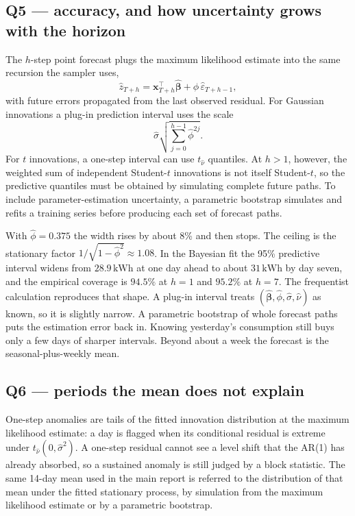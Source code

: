 \documentclass[11pt]{article}
\newcommand{\kwh}{\,\mathrm{kWh}}
\begin{document}
\subsection{Q5 --- accuracy, and how uncertainty grows with the horizon}

The $h$-step point forecast plugs the maximum likelihood estimate into the
same recursion the sampler uses,
\[
\hat z_{T+h}
 = \mathbf{x}_{T+h}^{\top}\hat{\boldsymbol\beta}
 + \hat\phi\,\hat\varepsilon_{T+h-1},
\]
with future errors propagated from the last observed residual. For Gaussian
innovations a plug-in prediction interval uses the scale
\[
\hat\sigma\sqrt{\sum_{j=0}^{h-1}\hat\phi^{2j}}.
\]
For $t$ innovations, a one-step interval can use $t_{\hat\nu}$ quantiles.
At $h>1$, however, the weighted sum of independent Student-$t$ innovations is
not itself Student-$t$, so the predictive quantiles must be obtained by
simulating complete future paths. To include parameter-estimation uncertainty,
a parametric bootstrap simulates and refits a training series before producing
each set of forecast paths.

With $\hat\phi = 0.375$ the width rises by about 8\% and then stops. The
ceiling is the stationary factor $1/\sqrt{1-\hat\phi^2} \approx 1.08$. In the
Bayesian fit the 95\% predictive interval widens from $28.9\kwh$ at one day
ahead to about $31\kwh$ by day seven, and the empirical coverage is $94.5\%$
at $h = 1$ and $95.2\%$ at $h = 7$. The frequentist calculation reproduces
that shape. A plug-in interval treats
$(\hat{\boldsymbol\beta},\hat\phi,\hat\sigma,\hat\nu)$ as known, so it is
slightly narrow. A parametric bootstrap of whole forecast paths puts the
estimation error back in. Knowing yesterday's consumption still buys only a
few days of sharper intervals. Beyond about a week the forecast is the
seasonal-plus-weekly mean.

\subsection{Q6 --- periods the mean does not explain}

One-step anomalies are tails of the fitted innovation distribution at the
maximum likelihood estimate: a day is flagged when its conditional residual is
extreme under $t_{\hat\nu}(0,\hat\sigma^2)$. A one-step residual cannot see a
level shift that the AR(1) has already absorbed, so a sustained anomaly is
still judged by a block statistic. The same 14-day mean used in the main
report is referred to the distribution of that mean under the fitted
stationary process, by simulation from the maximum likelihood estimate or by
a parametric bootstrap.
\end{document}
